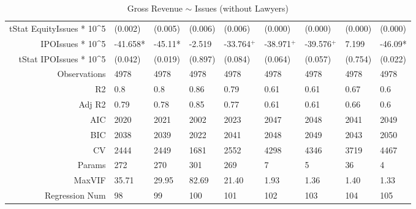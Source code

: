 \begin{table}[ht]
\begin{tabular}{rllllllll}
  tStat EquityIssues * 10^5 & (0.002) & (0.005) & (0.006) & (0.006) & (0.000) & (0.000) & (0.000) & (0.000) \\ 
  IPOIssues * 10^5 & -41.658* & -45.11* & -2.519 & -33.764$^{+}$ & -38.971$^{+}$ & -39.576$^{+}$ & 7.199 & -46.09* \\ 
  tStat IPOIssues * 10^5 & (0.042) & (0.019) & (0.897) & (0.084) & (0.064) & (0.057) & (0.754) & (0.022) \\ 
  Observations & 4978 & 4978 & 4978 & 4978 & 4978 & 4978 & 4978 & 4978 \\ 
  R2 & 0.8 & 0.8 & 0.86 & 0.79 & 0.61 & 0.61 & 0.67 & 0.6 \\ 
  Adj R2 & 0.79 & 0.78 & 0.85 & 0.77 & 0.61 & 0.61 & 0.66 & 0.6 \\ 
  AIC & 2020 & 2021 & 2002 & 2023 & 2047 & 2048 & 2041 & 2049 \\ 
  BIC & 2038 & 2039 & 2022 & 2041 & 2048 & 2049 & 2043 & 2050 \\ 
  CV & 2444 & 2449 & 1681 & 2552 & 4298 & 4346 & 3719 & 4467 \\ 
  Params & 272 & 270 & 301 & 269 & 7 & 5 & 36 & 4 \\ 
  MaxVIF & 35.71 & 29.95 & 82.69 & 21.40 & 1.93 & 1.36 & 1.40 & 1.33 \\ 
  Regression Num & 98 & 99 & 100 & 101 & 102 & 103 & 104 & 105 \\ 
   \hline
\end{tabular}
\caption{Gross Revenue $\sim$ Issues (without Lawyers)} 
\end{table}
